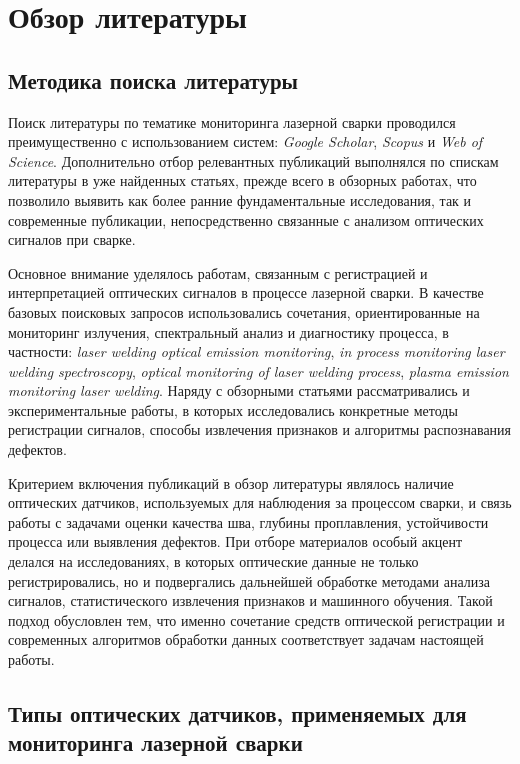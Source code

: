 \chapter{Обзор литературы}


\section{Методика поиска литературы}

Поиск литературы по тематике мониторинга лазерной сварки проводился преимущественно с использованием систем: \textit{Google Scholar}, \textit{Scopus} и \textit{Web of Science}. Дополнительно отбор релевантных публикаций выполнялся по спискам литературы в уже найденных статьях, прежде всего в обзорных работах, что позволило выявить как более ранние фундаментальные исследования, так и современные публикации, непосредственно связанные с анализом оптических сигналов при сварке.

Основное внимание уделялось работам, связанным с регистрацией и интерпретацией оптических сигналов в процессе лазерной сварки. В качестве базовых поисковых запросов использовались сочетания, ориентированные на мониторинг излучения, спектральный анализ и диагностику процесса, в частности: \textit{laser welding optical emission monitoring}, \textit{in process monitoring laser welding spectroscopy}, \textit{optical monitoring of laser welding process}, \textit{plasma emission monitoring laser welding}. Наряду с обзорными статьями рассматривались и экспериментальные работы, в которых исследовались конкретные методы регистрации сигналов, способы извлечения признаков и алгоритмы распознавания дефектов.

Критерием включения публикаций в обзор литературы являлось наличие оптических датчиков, используемых для наблюдения за процессом сварки, и связь работы с задачами оценки качества шва, глубины проплавления, устойчивости процесса или выявления дефектов. При отборе материалов особый акцент делался на исследованиях, в которых оптические данные не только регистрировались, но и подвергались дальнейшей обработке методами анализа сигналов, статистического извлечения признаков и машинного обучения. Такой подход обусловлен тем, что именно сочетание средств оптической регистрации и современных алгоритмов обработки данных соответствует задачам настоящей работы.


\section{Типы оптических датчиков, применяемых для мониторинга лазерной сварки}

